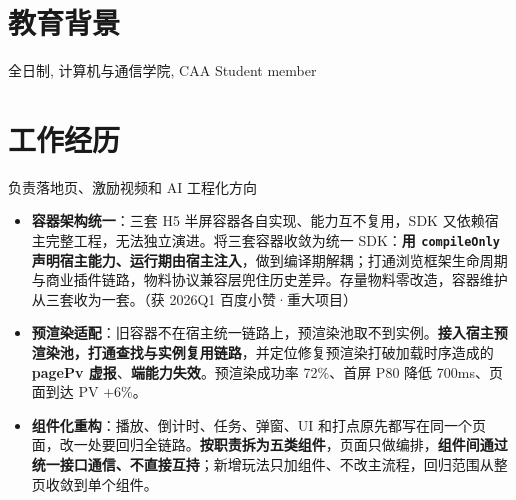\documentclass{resume}
\begin{document}



\section{教育背景}
全日制, 计算机与通信学院, CAA Student member

\section{工作经历}
负责落地页、激励视频和 AI 工程化方向

\begin{onehalfspacing}
  \begin{itemize}
    \item \textbf{容器架构统一}：三套 H5 半屏容器各自实现、能力互不复用，SDK 又依赖宿主完整工程，无法独立演进。将三套容器收敛为统一 SDK：\textbf{用 \texttt{compileOnly} 声明宿主能力、运行期由宿主注入}，做到编译期解耦；打通浏览框架生命周期与商业插件链路，物料协议兼容层兜住历史差异。存量物料零改造，容器维护从三套收为一套。（获 2026Q1 百度小赞·重大项目）

    \item \textbf{预渲染适配}：旧容器不在宿主统一链路上，预渲染池取不到实例。\textbf{接入宿主预渲染池，打通查找与实例复用链路}，并定位修复预渲染打破加载时序造成的 \textbf{pagePv 虚报}、\textbf{端能力失效}。预渲染成功率 72\%、首屏 P80 降低 700ms、页面到达 PV +6\%。
  \end{itemize}
\end{onehalfspacing}

\begin{onehalfspacing}
  \begin{itemize}
    \item \textbf{组件化重构}：播放、倒计时、任务、弹窗、UI 和打点原先都写在同一个页面，改一处要回归全链路。\textbf{按职责拆为五类组件}，页面只做编排，\textbf{组件间通过统一接口通信、不直接互持}；新增玩法只加组件、不改主流程，回归范围从整页收敛到单个组件。
  \end{itemize}
\end{onehalfspacing}
\end{document}
